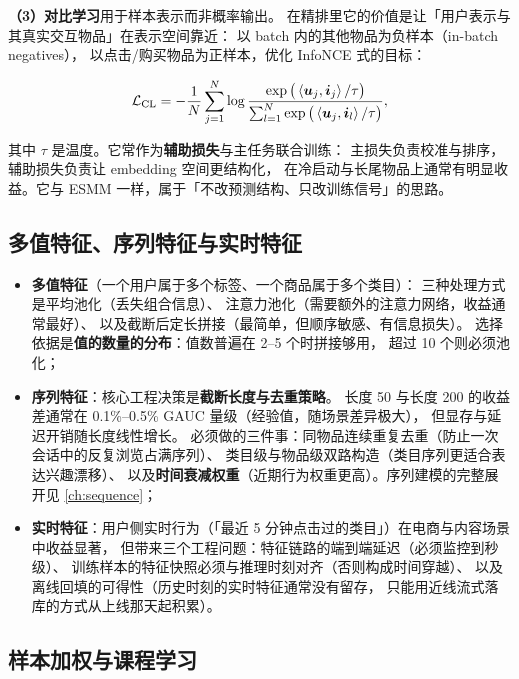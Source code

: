 \textbf{（3）对比学习}用于样本表示而非概率输出。
在精排里它的价值是让「用户表示与其真实交互物品」在表示空间靠近：
以 batch 内的其他物品为负样本（in-batch negatives），
以点击/购买物品为正样本，优化 InfoNCE 式的目标：

\begin{equation}
\mathcal{L}_{\mathrm{CL}} = -\frac{1}{N}\sum_{j=1}^{N}
\log \frac{\exp\big( \left\langle \bm{u}_j, \bm{i}_j \right\rangle / \tau \big)}
{\sum_{l=1}^{N} \exp\big( \left\langle \bm{u}_j, \bm{i}_l \right\rangle / \tau \big)} ,
\label{eq:infonce}
\end{equation}

其中 $\tau$ 是温度。它常作为\textbf{辅助损失}与主任务联合训练：
主损失负责校准与排序，辅助损失负责让 embedding 空间更结构化，
在冷启动与长尾物品上通常有明显收益。它与 ESMM 一样，属于「不改预测结构、只改训练信号」的思路。

\subsection{多值特征、序列特征与实时特征}

\begin{itemize}
  \item \textbf{多值特征}（一个用户属于多个标签、一个商品属于多个类目）：
        三种处理方式是平均池化（丢失组合信息）、
        注意力池化（需要额外的注意力网络，收益通常最好）、
        以及截断后定长拼接（最简单，但顺序敏感、有信息损失）。
        选择依据是\textbf{值的数量的分布}：值数普遍在 2--5 个时拼接够用，
        超过 10 个则必须池化；
  \item \textbf{序列特征}：核心工程决策是\textbf{截断长度与去重策略}。
        长度 50 与长度 200 的收益差通常在 0.1\%--0.5\% GAUC 量级（经验值，随场景差异极大），
        但显存与延迟开销随长度线性增长。
        必须做的三件事：同物品连续重复去重（防止一次会话中的反复浏览占满序列）、
        类目级与物品级双路构造（类目序列更适合表达兴趣漂移）、
        以及\textbf{时间衰减权重}（近期行为权重更高）。序列建模的完整展开见 \cref{ch:sequence}；
  \item \textbf{实时特征}：用户侧实时行为（「最近 5 分钟点击过的类目」）在电商与内容场景中收益显著，
        但带来三个工程问题：特征链路的端到端延迟（必须监控到秒级）、
        训练样本的特征快照必须与推理时刻对齐（否则构成时间穿越）、
        以及离线回填的可得性（历史时刻的实时特征通常没有留存，
        只能用近线流式落库的方式从上线那天起积累）。
\end{itemize}

\subsection{样本加权与课程学习}

